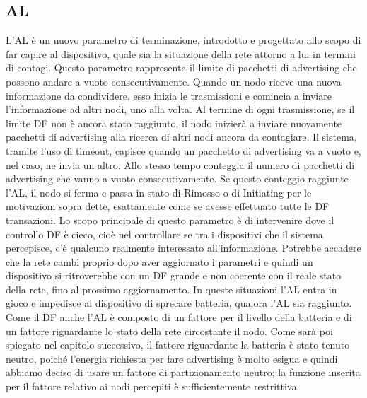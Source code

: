 \subsection{\acf{AL}}
L'\acf{AL} è un nuovo parametro di terminazione, introdotto e progettato allo scopo di far capire al dispositivo, quale sia la situazione della rete attorno a lui in termini di contagi. Questo parametro rappresenta il limite di pacchetti di advertising che possono andare a vuoto consecutivamente. Quando un nodo riceve una nuova informazione da condividere, esso inizia le trasmissioni e comincia a inviare l'informazione ad altri nodi, uno alla volta. Al termine di ogni trasmissione, se il limite DF non è ancora stato raggiunto, il nodo inizierà a inviare nuovamente pacchetti di advertising alla ricerca di altri nodi ancora da contagiare. Il sistema, tramite l'uso di timeout, capisce quando un pacchetto di advertising va a vuoto e, nel caso, ne invia un altro. Allo stesso tempo conteggia il numero di pacchetti di advertising che vanno a vuoto consecutivamente. Se questo conteggio raggiunte l'AL, il nodo si ferma e passa in stato di Rimosso o di Initiating per le motivazioni sopra dette, esattamente come se avesse effettuato tutte le DF transazioni. Lo scopo principale di questo parametro è di intervenire dove il controllo DF è cieco, cioè nel controllare se tra i dispositivi che il sistema percepisce, c'è qualcuno realmente interessato all'informazione. Potrebbe accadere che la rete cambi proprio dopo aver aggiornato i parametri e quindi un dispositivo si ritroverebbe con un DF grande e non coerente con il reale stato della rete, fino al prossimo aggiornamento. In queste situazioni l'AL entra in gioco e impedisce al dispositivo di sprecare batteria, qualora l'AL sia raggiunto.
Come il DF anche l'AL è composto di un fattore per il livello della batteria e di un fattore riguardante lo stato della rete circostante il nodo. Come sarà poi spiegato nel capitolo successivo, il fattore riguardante la batteria è stato tenuto neutro, poiché l'energia richiesta per fare advertising è molto esigua e quindi abbiamo deciso di usare un fattore di partizionamento neutro; la funzione inserita per il fattore relativo ai nodi percepiti è sufficientemente restrittiva.

